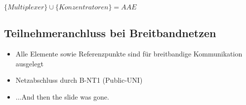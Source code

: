 \documentclass{scrartcl}
\begin{document}
\noindent
$\{Multiplexer\} \cup \{Konzentratoren\} = AAE$

\subsection {Teilnehmeranchluss bei Breitbandnetzen}

\begin{itemize}
	\item Alle Elemente sowie Referenzpunkte sind für breitbandige Kommunikation ausgelegt
	\item Netzabschluss durch B-NT1 (Public-UNI)
	\item ...And then the slide was gone.
\end{itemize}
\end{document}
